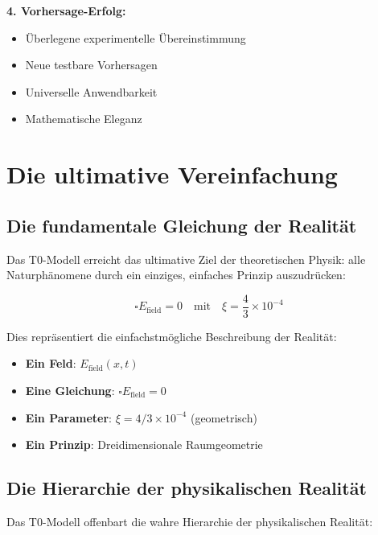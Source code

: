 \documentclass[12pt,a4paper]{report}
\begin{document}
	\textbf{4. Vorhersage-Erfolg:}
	\begin{itemize}
		\item Überlegene experimentelle Übereinstimmung
		\item Neue testbare Vorhersagen
		\item Universelle Anwendbarkeit
		\item Mathematische Eleganz
	\end{itemize}
	
	\section{Die ultimative Vereinfachung}
	\label{sec:ultimate_simplification}
	
	\subsection{Die fundamentale Gleichung der Realität}
	\label{subsec:fundamental_equation}
	
	Das T0-Modell erreicht das ultimative Ziel der theoretischen Physik: alle Naturphänomene durch ein einziges, einfaches Prinzip auszudrücken:
	
	\begin{equation}
		\boxed{\square E_{\text{field}} = 0 \quad \text{mit} \quad \xi = \frac{4}{3} \times 10^{-4}}
	\end{equation}
	
	Dies repräsentiert die einfachstmögliche Beschreibung der Realität:
	\begin{itemize}
		\item \textbf{Ein Feld}: $E_{\text{field}}(x,t)$
		\item \textbf{Eine Gleichung}: $\square E_{\text{field}} = 0$
		\item \textbf{Ein Parameter}: $\xi = 4/3 \times 10^{-4}$ (geometrisch)
		\item \textbf{Ein Prinzip}: Dreidimensionale Raumgeometrie
	\end{itemize}
	
	\subsection{Die Hierarchie der physikalischen Realität}
	\label{subsec:hierarchy_reality}
	
	Das T0-Modell offenbart die wahre Hierarchie der physikalischen Realität:
	
\end{document}
